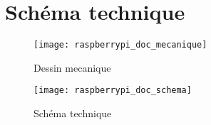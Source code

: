\newpage
\section{Schéma technique}



\begin{figure}[!h]
  \centering
  \texttt{[image: raspberrypi\_doc\_mecanique]}
  \caption{Dessin mecanique}
\end{figure}

\begin{figure}[!h]
  \centering
  \texttt{[image: raspberrypi\_doc\_schema]}
  \caption{Schéma technique}
\end{figure}

